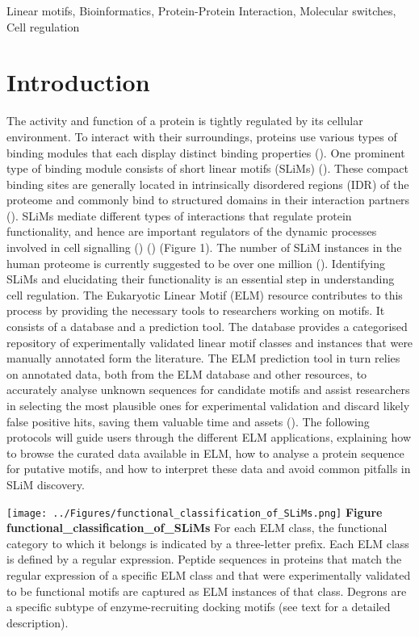 Linear motifs, Bioinformatics, Protein-Protein Interaction, Molecular
switches, Cell regulation

\section{Introduction}\label{introduction}

The activity and function of a protein is tightly regulated by its
cellular environment. To interact with their surroundings, proteins use
various types of binding modules that each display distinct binding
properties (\cite{10550212}). One prominent type of binding module
consists of short linear motifs (SLiMs) (\cite{18508681}). These compact
binding sites are generally located in intrinsically disordered regions
(IDR) of the proteome and commonly bind to structured domains in their
interaction partners (\cite{21909575}). SLiMs mediate different types of
interactions that regulate protein functionality, and hence are
important regulators of the dynamic processes involved in cell
signalling (\cite{22480932}) (\cite{24926813}) (Figure 1). The number of
SLiM instances in the human proteome is currently suggested to be over
one million (\cite{25038412}). Identifying SLiMs and elucidating their
functionality is an essential step in understanding cell regulation. The
Eukaryotic Linear Motif (ELM) resource contributes to this process by
providing the necessary tools to researchers working on motifs. It
consists of a database and a prediction tool. The database provides a
categorised repository of experimentally validated linear motif classes
and instances that were manually annotated form the literature. The ELM
prediction tool in turn relies on annotated data, both from the ELM
database and other resources, to accurately analyse unknown sequences
for candidate motifs and assist researchers in selecting the most
plausible ones for experimental validation and discard likely false
positive hits, saving them valuable time and assets (\cite{22110040}).
The following protocols will guide users through the different ELM
applications, explaining how to browse the curated data available in
ELM, how to analyse a protein sequence for putative motifs, and how to
interpret these data and avoid common pitfalls in SLiM discovery.

\texttt{[image: ../Figures/functional\_classification\_of\_SLiMs.png]}
\textbf{Figure functional\_classification\_of\_SLiMs} For each ELM
class, the functional category to which it belongs is indicated by a
three-letter prefix. Each ELM class is defined by a regular expression.
Peptide sequences in proteins that match the regular expression of a
specific ELM class and that were experimentally validated to be
functional motifs are captured as ELM instances of that class. Degrons
are a specific subtype of enzyme-recruiting docking motifs (see text for
a detailed description).

